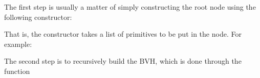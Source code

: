 \documentclass[letterpaper,10pt,english]{sphinxmanual}
\begin{document}
\sphinxAtStartPar
The first step is usually a matter of simply constructing the root node using the following constructor:

\begin{sphinxVerbatim}[commandchars=\\\{\}]
        
   
\end{sphinxVerbatim}

\sphinxAtStartPar
That is, the constructor takes a list of primitives to be put in the node.
For example:

\begin{sphinxVerbatim}[commandchars=\\\{\}]
      
   

  

   
\end{sphinxVerbatim}

\sphinxAtStartPar
The second step is to recursively build the BVH, which is done through the function
\end{document}
